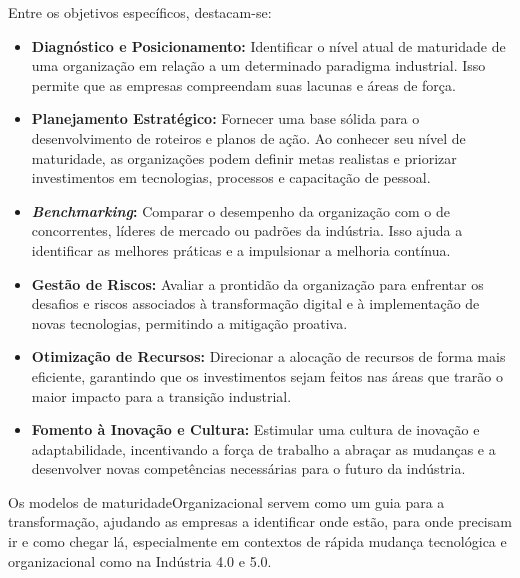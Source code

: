 Entre os objetivos específicos, destacam-se:
\begin{itemize}
    \item \textbf{Diagnóstico e Posicionamento:} Identificar o nível atual de maturidade de uma organização em relação a um determinado paradigma industrial.
    Isso permite que as empresas compreendam suas lacunas e áreas de força. %
    \item \textbf{Planejamento Estratégico:} Fornecer uma base sólida para o desenvolvimento de roteiros e planos de ação.
    Ao conhecer seu nível de maturidade, as organizações podem definir metas realistas e priorizar investimentos em tecnologias, processos e capacitação de pessoal.%
    \item \textbf{\textit{Benchmarking}:} Comparar o desempenho da organização com o de concorrentes, líderes de mercado ou padrões da indústria.
    Isso ajuda a identificar as melhores práticas e a impulsionar a melhoria contínua.%
    \item \textbf{Gestão de Riscos:} Avaliar a prontidão da organização para enfrentar os desafios e riscos associados à transformação digital e à implementação de novas tecnologias, permitindo a mitigação proativa.%
    \item \textbf{Otimização de Recursos:} Direcionar a alocação de recursos de forma mais eficiente, garantindo que os investimentos sejam feitos nas áreas que trarão o maior impacto para a transição industrial.%
    \item \textbf{Fomento à Inovação e Cultura:} Estimular uma cultura de inovação e adaptabilidade, incentivando a força de trabalho a abraçar as mudanças e a desenvolver novas competências necessárias para o futuro da indústria.%
\end{itemize}

Os modelos de \gls{maturidadeOrganizacional} servem como um guia para a transformação, ajudando as empresas a identificar onde estão, para onde precisam ir e como chegar lá, especialmente em contextos de rápida mudança tecnológica e organizacional como na Indústria 4.0 e 5.0.%

